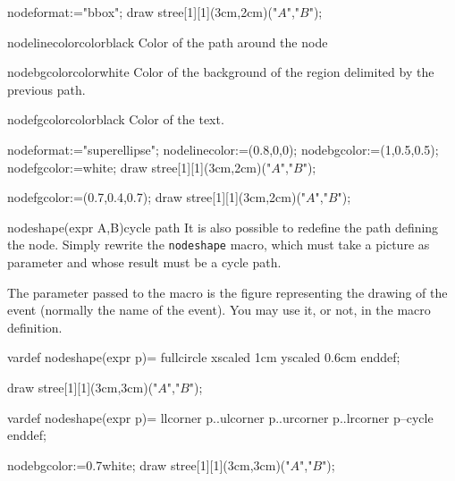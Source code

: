 \documentclass[11pt,a4paper,english]{article}
\begin{document}
\begin{exemple}[lefthand ratio=0.65]
 nodeformat:="bbox";
 draw stree[1][1](3cm,2cm)("$A$","$B$");
\end{exemple}

\begin{mptparam}{nodelinecolor}{color}{black}
Color of the path around the node
\end{mptparam}

\begin{mptparam}{nodebgcolor}{color}{white}
Color of the background of the region delimited by the previous path.
\end{mptparam}

\begin{mptparam}{nodefgcolor}{color}{black}
Color of the text.
\end{mptparam}



\begin{exemple}[lefthand ratio=0.65]
nodeformat:="superellipse";
nodelinecolor:=(0.8,0,0);
nodebgcolor:=(1,0.5,0.5);
nodefgcolor:=white;
draw stree[1][1](3cm,2cm)("$A$","$B$");
\end{exemple}


\begin{exemple}[lefthand ratio=0.65]
nodefgcolor:=(0.7,0.4,0.7);
draw stree[1][1](3cm,2cm)("$A$","$B$");
\end{exemple}

\begin{rpobjet}{nodeshape(expr A,B)}{cycle path}
It is also possible to redefine the path defining the node. Simply rewrite the \verb|nodeshape| macro, which must take a picture as parameter and whose result must be a cycle path.

The parameter passed to the macro is the figure representing the drawing of the event (normally the name of the event). You may use it, or not, in the macro definition.
\end{rpobjet}

\begin{exemple}[lefthand ratio=0.6]
vardef nodeshape(expr p)=
  fullcircle xscaled 1cm yscaled 0.6cm
enddef;

draw stree[1][1](3cm,3cm)("$A$","$B$");
\end{exemple}


\begin{exemple}[lefthand ratio=0.7]
vardef nodeshape(expr p)=
  llcorner p..ulcorner p..urcorner p..lrcorner p--cycle
enddef;

nodebgcolor:=0.7white;
draw stree[1][1](3cm,3cm)("$A$","$B$");
\end{exemple}
\end{document}
